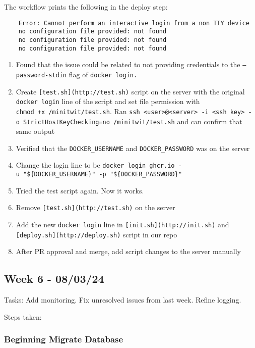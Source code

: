 The workflow prints the following in the deploy step:
\begin{verbatim}
    Error: Cannot perform an interactive login from a non TTY device
    no configuration file provided: not found
    no configuration file provided: not found
    no configuration file provided: not found
\end{verbatim}

\begin{enumerate}
    \item Found that the issue could be related to not providing credentials to the \texttt{—password-stdin} flag of \texttt{docker\ login.}
    \item Create \texttt{{[}test.sh{]}(http://test.sh)} script on the server with the original \texttt{docker\ login} line of the script and set file permission with \texttt{chmod\ +x\ /minitwit/test.sh}. Ran \texttt{ssh\ \textless{}user\textgreater{}@\textless{}server\textgreater{}\ -i\ \textless{}ssh\ key\textgreater{}\ -o\ StrictHostKeyChecking=no\ \textquotesingle{}/minitwit/test.sh\textquotesingle{}} and can confirm that same output
    \item Verified that the \texttt{DOCKER\_USERNAME} and \texttt{DOCKER\_PASSWORD} was on the server
    \item Change the login line to be \texttt{docker\ login\ ghcr.io\ -u\ "\$\{DOCKER\_USERNAME\}"\ -p\ "\$\{DOCKER\_PASSWORD\}"}
    \item Tried the test script again. Now it works.
    \item Remove \texttt{{[}test.sh{]}(http://test.sh)} on the server
    \item Add the new \texttt{docker\ login} line in \texttt{{[}init.sh{]}(http://init.sh)} and \texttt{{[}deploy.sh{]}(http://deploy.sh)} script in our repo
    \item After PR approval and merge, add script changes to the server manually
\end{enumerate}

\subsection{Week 6 - 08/03/24}
\label{log:week6}

Tasks: Add monitoring. Fix unresolved issues from last week. Refine
logging.

Steps taken:

\subsubsection{Beginning Migrate Database}
\label{log:beginning-migrate-database}

